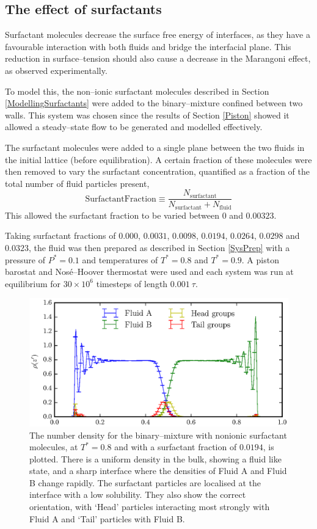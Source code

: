 \subsection{The effect of surfactants}
Surfactant molecules decrease the surface free energy of interfaces, as they have a favourable interaction with both fluids and bridge the interfacial plane.
This reduction in surface--tension should also cause a decrease in the Marangoni effect, as observed experimentally.\cite{KimSubramanianA,KimSubramanianB,BartonSubramanian,ChenStebe}

To model this, the non--ionic surfactant molecules described in Section \ref{ModellingSurfactants} were added to the binary--mixture confined between two walls.
This system was chosen since the results of Section \ref{Piston} showed it allowed a steady--state flow to be generated and modelled effectively.

The surfactant molecules were added to a single plane between the two fluids in the initial lattice (before equilibration).
A certain fraction of these molecules were then removed to vary the surfactant concentration, quantified as a fraction of the total number of fluid particles present,
\begin{equation}
\mathrm{Surfactant Fraction} \equiv \frac{N_{\mathrm{surfactant}}}{N_{\mathrm{surfactant}}+N_{\mathrm{fluid}}}
\end{equation}
This allowed the surfactant fraction to be varied between $0$ and $0.00323$.

Taking surfactant fractions of $0.000$, $0.0031$, $0.0098$, $0.0194$, $0.0264$, $0.0298$ and $0.0323$, the fluid was then prepared as described in Section \ref{SysPrep} with a pressure of $P^{*}=0.1$ and temperatures of $T^{*}=0.8$ and $T^{*}=0.9$.
A piston barostat and Nos\'{e}--Hoover thermostat were used and each system was run at equilibrium for $30 \times 10^{6}$ timesteps of length $0.001\ \tau$.

\begin{figure}[h]
\centering
\includegraphics[scale=0.8]{SurfRho}
\caption{The number density for the binary--mixture with nonionic surfactant molecules, at  $T^{*}=0.8$ and with a surfactant fraction of $0.0194$, is plotted.
There is a uniform density in the bulk, showing a fluid like state, and a sharp interface where the densities of Fluid A and Fluid B change rapidly.
The surfactant particles are localised at the interface with a low solubility.
They also show the correct orientation, with `Head' particles interacting most strongly with Fluid A and `Tail' particles with Fluid B.
}
\label{SurfRho}
\end{figure}

